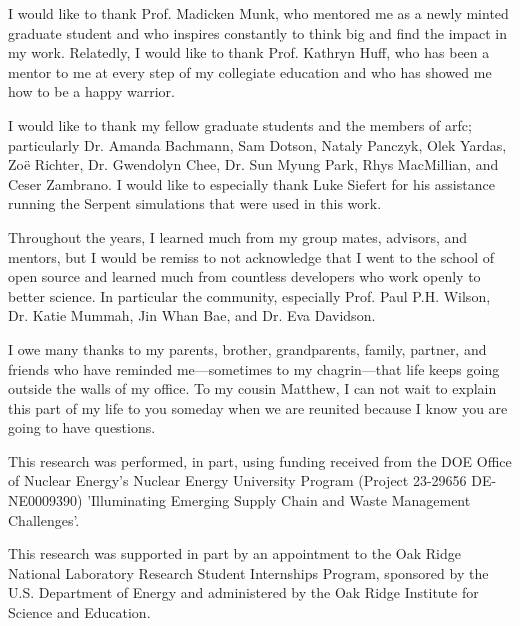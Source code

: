 I would like to thank Prof. Madicken Munk, who mentored me as a newly minted
graduate student and who inspires constantly to think big and find the impact
in my work. Relatedly, I would like to thank Prof. Kathryn Huff, who has been a
mentor to me at every step of my collegiate education and who has
showed me how to be a happy warrior.

I would like to thank my fellow graduate students and the members of
\gls{arfc}; particularly Dr. Amanda Bachmann, Sam Dotson, Nataly Panczyk, Olek
Yardas, Zo\"{e} Richter, Dr. Gwendolyn Chee, Dr. Sun Myung Park, Rhys
MacMillian, and Ceser Zambrano. I would like to especially thank Luke Siefert
for his assistance running the Serpent simulations that were used in this work.

Throughout the years, I learned much from my group mates, advisors, and
mentors, but I would be remiss to not acknowledge that I went to the school of
open source and learned much from countless developers who work openly to
better science. In particular the \cyclus community, especially Prof. Paul P.H.
Wilson, Dr. Katie Mummah, Jin Whan Bae, and Dr. Eva Davidson.

I owe many thanks to my parents, brother, grandparents, family, partner, and
friends who have reminded me---sometimes to my chagrin---that life keeps going
outside the walls of my office. To my cousin Matthew, I can not wait to explain
this part of my life to you someday when we are reunited because I know you are
going to have questions.

This research was performed, in part, using funding received from the DOE
Office of Nuclear Energy's Nuclear Energy University Program (Project 23-29656
DE-NE0009390) 'Illuminating Emerging Supply Chain and Waste Management
Challenges'.

This research was supported in part by an appointment to the Oak Ridge National
Laboratory Research Student Internships Program, sponsored by the U.S.
Department of Energy and administered by the Oak Ridge Institute for Science
and Education.